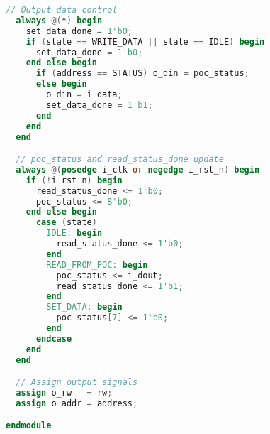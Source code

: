 \documentclass[lang=cn,a4paper,newtx]{elegantpaper}
\begin{document}
\begin{lstlisting}[language=verilog]
  // Output data control
  always @(*) begin
    set_data_done = 1'b0;
    if (state == WRITE_DATA || state == IDLE) begin
      set_data_done = 1'b0;
    end else begin
      if (address == STATUS) o_din = poc_status;
      else begin
        o_din = i_data;
        set_data_done = 1'b1;
      end
    end
  end

  // poc_status and read_status_done update
  always @(posedge i_clk or negedge i_rst_n) begin
    if (!i_rst_n) begin
      read_status_done <= 1'b0;
      poc_status <= 8'b0;
    end else begin
      case (state)
        IDLE: begin
          read_status_done <= 1'b0;
        end
        READ_FROM_POC: begin
          poc_status <= i_dout;
          read_status_done <= 1'b1;
        end
        SET_DATA: begin
          poc_status[7] <= 1'b0;
        end
      endcase
    end
  end

  // Assign output signals
  assign o_rw   = rw;
  assign o_addr = address;

endmodule

\end{lstlisting}
\end{document}
